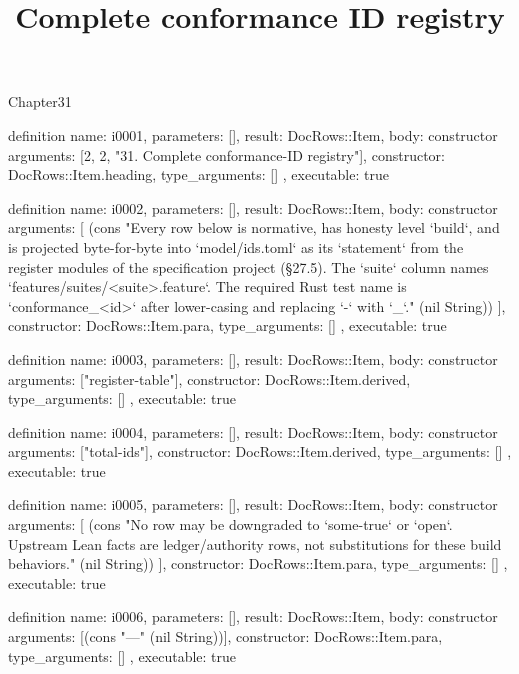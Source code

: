 \begin{lexlean}{Chapter31}
\title{Complete conformance ID registry}
\begin{semanticmodule}
definition{
  name: i0001,
  parameters: [],
  result: DocRows::Item,
  body: constructor{
    arguments: [2, 2, "31. Complete conformance-ID registry"],
    constructor: DocRows::Item.heading,
    type_arguments: []
  },
  executable: true
}

definition{
  name: i0002,
  parameters: [],
  result: DocRows::Item,
  body: constructor{
    arguments: [
      (cons "Every row below is normative, has honesty level `build`, and is projected byte-for-byte into `model/ids.toml` as its `statement` from the register modules of the specification project (§27.5). The `suite` column names `features/suites/<suite>.feature`. The required Rust test name is `conformance_<id>` after lower-casing and replacing `-` with `_`." (nil String))
    ],
    constructor: DocRows::Item.para,
    type_arguments: []
  },
  executable: true
}

definition{
  name: i0003,
  parameters: [],
  result: DocRows::Item,
  body: constructor{
    arguments: ["register-table"],
    constructor: DocRows::Item.derived,
    type_arguments: []
  },
  executable: true
}

definition{
  name: i0004,
  parameters: [],
  result: DocRows::Item,
  body: constructor{
    arguments: ["total-ids"],
    constructor: DocRows::Item.derived,
    type_arguments: []
  },
  executable: true
}

definition{
  name: i0005,
  parameters: [],
  result: DocRows::Item,
  body: constructor{
    arguments: [
      (cons "No row may be downgraded to `some-true` or `open`. Upstream Lean facts are ledger/authority rows, not substitutions for these build behaviors." (nil String))
    ],
    constructor: DocRows::Item.para,
    type_arguments: []
  },
  executable: true
}

definition{
  name: i0006,
  parameters: [],
  result: DocRows::Item,
  body: constructor{
    arguments: [(cons "---" (nil String))],
    constructor: DocRows::Item.para,
    type_arguments: []
  },
  executable: true
}
\end{semanticmodule}
\end{lexlean}
